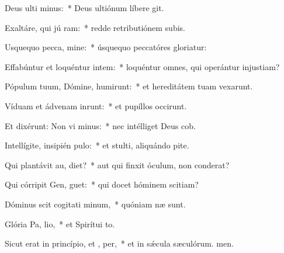 \item Deus ulti minus:~* Deus ultiónum líbere git.
\item Exaltáre, qui jú ram:~* redde retributiónem subis.
\item Usquequo pecca, mine:~* úsquequo peccatóres gloriatur:
\item Effabúntur et loquéntur intem:~* loquéntur omnes, qui operántur injustiam?
\item Pópulum tuum, Dómine, humirunt:~* et hereditátem tuam vexarunt.
\item Víduam et ádvenam inrunt:~* et pupíllos occirunt.
\item Et dixérunt: Non vi minus:~* nec intélliget Deus cob.
\item Intellígite, insipién  pulo:~* et stulti, aliquándo pite.
\item Qui plantávit au,  diet?~* aut qui finxit óculum, non conderat?
\item Qui córripit Gen,  guet:~* qui docet hóminem scitiam?
\item Dóminus scit cogitati minum,~* quóniam næ sunt.
\item Glória Pa,  lio,~* et Spirítui to.
\item Sicut erat in princípio, et ,  per,~* et in sǽcula sæculórum. men.
